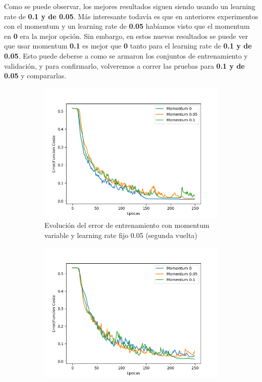 Como se puede observar, los mejores resultados siguen siendo usando un learning rate de \textbf{0.1 y de 0.05}. Más interesante todavía es que en 
anteriores experimentos con el momentum y un learning rate de \textbf{0.05} habíamos visto que el momentum en \textbf{0} era la mejor opción. Sin embargo,
 en estos nuevos resultados se puede ver que usar momentum \textbf{0.1} es mejor que \textbf{0} tanto para el learning rate de \textbf{0.1 y de 0.05}. 
 Esto puede deberse a como se armaron los conjuntos de entrenamiento y validación, y para confirmarlo, volveremos a correr las pruebas para \textbf{0.1 y de 0.05}
 y compararlas.

\begin{figure}[!htbp]
\centering
\begin{subfigure}{.5\textwidth}
  \centering
  \includegraphics[width=1\linewidth]{graficos/eta_x_momentum_promedios_entrenamiento__0.png}
  \caption{Evolución del error de entrenamiento con momentum variable y learning rate fijo 0.05 (segunda vuelta)}
  \label{fig:sub1}
\end{subfigure}%
\begin{subfigure}{.5\textwidth}
  \centering
  \includegraphics[width=1\linewidth]{graficos/eta_x_momentum_promedios_entrenamiento__2.png}

\end{subfigure}
\end{figure}
